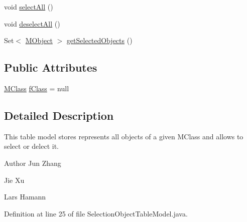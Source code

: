 \begin{DoxyCompactItemize}
\item 
void \hyperlink{classorg_1_1tzi_1_1use_1_1gui_1_1views_1_1selection_1_1objectselection_1_1_selection_object_table_model_af7bb6714db16b94c6aab139b04fb914b}{select\-All} ()
\item 
void \hyperlink{classorg_1_1tzi_1_1use_1_1gui_1_1views_1_1selection_1_1objectselection_1_1_selection_object_table_model_ac8c6122d9cebad7b4a320c8bfb801832}{deselect\-All} ()
\item 
Set$<$ \hyperlink{interfaceorg_1_1tzi_1_1use_1_1uml_1_1sys_1_1_m_object}{M\-Object} $>$ \hyperlink{classorg_1_1tzi_1_1use_1_1gui_1_1views_1_1selection_1_1objectselection_1_1_selection_object_table_model_afdbae5cd102bec0db0eb7127b0ab2a25}{get\-Selected\-Objects} ()
\end{DoxyCompactItemize}
\subsection*{Public Attributes}
\begin{DoxyCompactItemize}
\item 
\hyperlink{interfaceorg_1_1tzi_1_1use_1_1uml_1_1mm_1_1_m_class}{M\-Class} \hyperlink{classorg_1_1tzi_1_1use_1_1gui_1_1views_1_1selection_1_1objectselection_1_1_selection_object_table_model_ac3facd660010c362b7f2f2be4c02b532}{f\-Class} = null
\end{DoxyCompactItemize}


\subsection{Detailed Description}
This table model stores represents all objects of a given M\-Class and allows to select or delect it. \begin{DoxyAuthor}{Author}
Jun Zhang 

Jie Xu 

Lars Hamann 
\end{DoxyAuthor}


Definition at line 25 of file Selection\-Object\-Table\-Model.\-java.



